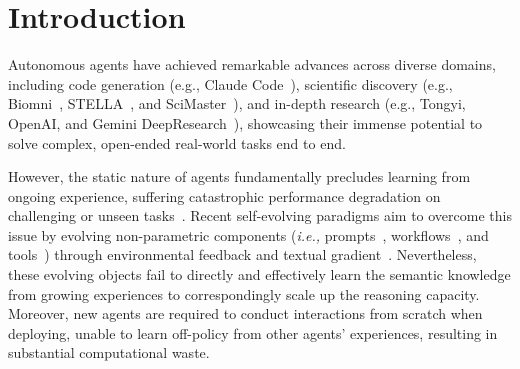 \section{Introduction}
Autonomous agents have achieved remarkable advances across diverse domains, including code generation (e.g., Claude Code~\cite{anthropic2025claude}), scientific discovery (e.g., Biomni~\cite{huang2025biomni}, STELLA~\cite{jin2025stellaselfevolvingllmagent}, and SciMaster~\cite{chai2025scimastergeneralpurposescientificai}), and in-depth research (e.g., Tongyi, OpenAI, and Gemini DeepResearch~\cite{tongyidr,openai2025deepresearch,google2025gemini}), showcasing their immense potential to solve complex, open-ended real-world tasks end to end. 

However, the static nature of agents fundamentally precludes learning from ongoing experience, suffering catastrophic performance degradation on challenging or unseen tasks~\cite{abbas2023loss,hadi2023large,goodfellow2013empirical}. 
Recent self-evolving paradigms aim to overcome this issue by evolving non-parametric components (\textit{i.e.,} prompts~\cite{yuksekgonul2024textgrad,zhang2025agentic}, workflows~\cite{lin2025se,zhang2025multi,shang2024agentsquare}, and tools~\cite{qian2023creator,qiu2025alita}) through environmental feedback and textual gradient~\cite{yuksekgonul2024textgrad,shinn2023reflexion,zhang2024revolve}. 
Nevertheless, these evolving objects fail to directly and effectively learn the semantic knowledge from growing experiences to correspondingly scale up the reasoning capacity.
Moreover, new agents are required to conduct interactions from scratch when deploying, unable to learn off-policy from other agents' experiences, resulting in substantial computational waste.


